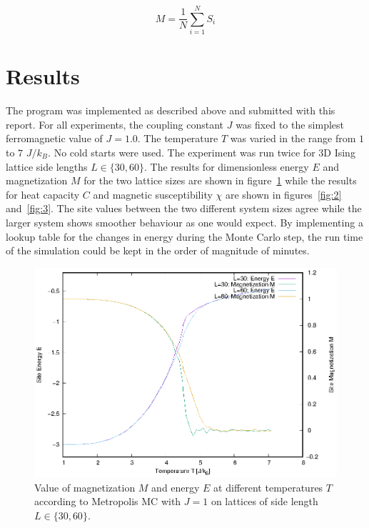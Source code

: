 \documentclass[11pt,a4paper]{article}
\begin{document}
\begin{equation}
	M = \frac{1}{N}\sum_{i=1}^{N}S_i
\label{eqn:2}
\end{equation}


\section{Results}

The program was implemented as described above and submitted with this report. 
For all experiments, the coupling constant $J$ was fixed to the simplest ferromagnetic value of $J=1.0$. The temperature $T$
was varied in the range from $1$ to $7$ $J/k_B$. No cold starts were used.
The experiment was run twice for 3D Ising lattice side lengths $L \in \{30, 60\}$. The results for dimensionless energy $E$ and magnetization $M$
 for the two lattice sizes are shown in figure~\ref{fig:1} while the results for heat capacity $C$ and magnetic susceptibility $\chi$ are shown in figures~\ref{fig:2} and~\ref{fig:3}.
The site values between the two different system sizes agree while the larger system shows smoother behaviour as one would expect.
By implementing a lookup table for the changes in energy during the Monte Carlo step, the run time of the simulation could be kept
in the order of magnitude of minutes.

\begin{figure}[ht]
\begin{center}
\includegraphics[scale=1.4]{figure1.eps} 
\end{center}
\caption{Value of magnetization $M$ and energy $E$ at different temperatures $T$ according to Metropolis MC with $J=1$ on lattices of side length $L\in\{30,60\}$.}
\label{fig:1}
\end{figure}
\end{document}
